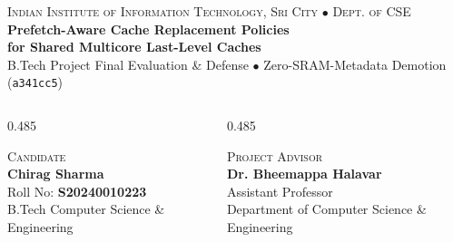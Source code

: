 \documentclass[aspectratio=169, 10pt]{beamer}
\begin{document}
\begin{frame}[plain]
  \vspace{0.45cm}
  \begin{tcolorbox}[
    enhanced, sharp corners, colback=Obsidian, colframe=Obsidian,
    boxrule=0pt, top=4.2mm, bottom=4.2mm, left=4.5mm, right=4.5mm
  ]
    \color{white}
    {\fontsize{7.5}{9}\selectfont\color{LineRule}\textsc{Indian Institute of Information Technology, Sri City $\bullet$ Dept. of CSE}}\\[0.22cm]
    {\fontsize{15}{18}\selectfont\textbf{Prefetch-Aware Cache Replacement Policies}}\\[0.08cm]
    {\fontsize{12}{15}\selectfont\textbf{\color{LineRule}for Shared Multicore Last-Level Caches}}\\[0.25cm]
    {\fontsize{8}{10}\selectfont\color{LineRule}B.Tech Project Final Evaluation \& Defense \quad $\bullet$ \quad Zero-SRAM-Metadata Demotion (\texttt{a341cc5})}
  \end{tcolorbox}

  \vspace{0.38cm}
  \begin{columns}[onlytextwidth]
    \begin{column}{0.485\textwidth}
      \begin{tcolorbox}[archpanel, top=2.4mm, bottom=2.4mm]
        {\scriptsize\color{TextMuted}\textsc{Candidate}}\\[0.08cm]
        {\normalsize\textbf{\color{Obsidian}Chirag Sharma}}\\[0.06cm]
        {\footnotesize Roll No: \textbf{S20240010223}}\\[0.03cm]
        {\scriptsize B.Tech Computer Science \& Engineering}
      \end{tcolorbox}
    \end{column}%
    \hfill%
    \begin{column}{0.485\textwidth}
      \begin{tcolorbox}[tealpanel, top=2.4mm, bottom=2.4mm]
        {\scriptsize\color{TextMuted}\textsc{Project Advisor}}\\[0.08cm]
        {\normalsize\textbf{\color{Obsidian}Dr. Bheemappa Halavar}}\\[0.06cm]
        {\footnotesize Assistant Professor}\\[0.03cm]
        {\scriptsize Department of Computer Science \& Engineering}
      \end{tcolorbox}
    \end{column}
  \end{columns}


\end{frame}
\end{document}
